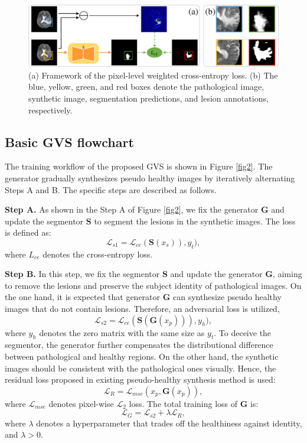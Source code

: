\documentclass[journal,twoside,web]{ieeecolor}
\begin{document}
\begin{figure}
	\centering
	\includegraphics[width=\textwidth]{./figs/wce.pdf}
	\caption{(a) Framework of the pixel-level weighted cross-entropy loss. (b) The blue, yellow, green, and red boxes denote the pathological image, synthetic image, segmentation predictions, and lesion annotations, respectively.
	}\label{fig4}
\end{figure}

\subsection{Basic GVS flowchart}
\label{subsection:flowchart}
The training workflow of the proposed GVS is shown in Figure \ref{fig2}. The generator gradually synthesizes pseudo healthy images by iteratively alternating Steps A and B. The specific steps are described as follows.

\noindent\textbf{Step A.} As shown in the Step A of Figure \ref{fig2}, we fix the generator $\mathbf{G}$ and update the segmentor $\mathbf{S}$ to segment the lesions in the synthetic images. The loss is defined as:
\begin{equation}
	\mathcal{L}_{s1} = \mathcal{L}_{ce}(\mathbf{S}(x_s)), y_t),
\end{equation} 
where $L_{ce}$ denotes the cross-entropy loss.

\noindent\textbf{Step B.} In this step, we fix the segmentor $\mathbf{S}$ and update the generator $\mathbf{G}$, aiming to remove the lesions and preserve the subject identity of pathological images. 
On the one hand, it is expected that generator $\mathbf{G}$ can synthesize pseudo healthy images that do not contain lesions. Therefore, an adversarial loss is utilized,
\begin{equation}\label{eq2}
	\mathcal{L}_{s2} = \mathcal{L}_{ce}(\mathbf{S}(\mathbf{G}(x_p))), y_h),
\end{equation} 
where $y_h$ denotes the zero matrix with the same size as $y_t$. To deceive the segmentor, the generator further compensates the distributional difference between pathological and healthy regions. 
On the other hand, the synthetic images should be consistent with the pathological ones visually. Hence, the residual loss proposed in existing pseudo-healthy synthesis method \cite{sun2020adversarial} is used:
\begin{equation}\label{eq3}
	\mathcal{L}_R = \mathcal{L}_{mse}(x_p,  \mathbf{G}(x_p)),
\end{equation} 
where $\mathcal{L}_{mse}$ denotes pixel-wise $\mathcal{L}_2$ loss.  The total training loss of  $\mathbf{G}$ is:
\begin{equation}
	\mathcal{L}_{G} = \mathcal{L}_{s2} + \lambda \mathcal{L}_R,
\end{equation} 
where $\lambda$ denotes a hyperparameter that trades off the healthiness against identity, and $\lambda > 0$.
 
\end{document}
